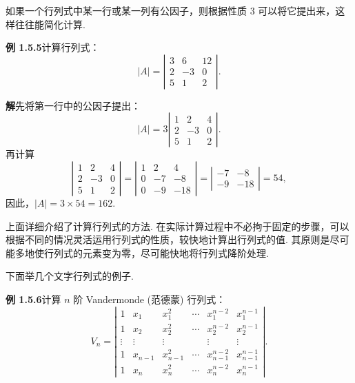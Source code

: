 \documentclass[UTF8,12pt,a4paper,fontset=fandol]{ctexart}
\begin{document}
如果一个行列式中某一行或某一列有公因子，则根据性质 3 可以将它提出来，这样往往能简化计算.

\noindent\textbf{例 1.5.5}\quad 计算行列式：
\[
|A|=\left|\begin{array}{rrr}
3 & 6 & 12\\
2 & -3 & 0\\
5 & 1 & 2
\end{array}\right|.
\]

\noindent\textbf{解}\quad 先将第一行中的公因子提出：
\[
|A|=3
\left|\begin{array}{rrr}
1 & 2 & 4\\
2 & -3 & 0\\
5 & 1 & 2
\end{array}\right|.
\]
再计算
\[
\left|\begin{array}{rrr}
1 & 2 & 4\\
2 & -3 & 0\\
5 & 1 & 2
\end{array}\right|
=
\left|\begin{array}{rrr}
1 & 2 & 4\\
0 & -7 & -8\\
0 & -9 & -18
\end{array}\right|
=
\left|\begin{array}{rr}
-7 & -8\\
-9 & -18
\end{array}\right|=54,
\]
因此，$|A|=3\times 54=162$.

上面详细介绍了计算行列式的方法. 在实际计算过程中不必拘于固定的步骤，可以根据不同的情况灵活运用行列式的性质，较快地计算出行列式的值. 其原则是尽可能多地使行列式的元素变为零，尽可能快地将行列式降阶处理.

下面举几个文字行列式的例子.

\noindent\textbf{例 1.5.6}\quad 计算 $n$ 阶 Vandermonde (范德蒙) 行列式：
\[
V_n=
\left|\begin{array}{cccccc}
1 & x_1 & x_1^2 & \cdots & x_1^{n-2} & x_1^{n-1}\\
1 & x_2 & x_2^2 & \cdots & x_2^{n-2} & x_2^{n-1}\\
\vdots & \vdots & \vdots & & \vdots & \vdots\\
1 & x_{n-1} & x_{n-1}^2 & \cdots & x_{n-1}^{n-2} & x_{n-1}^{n-1}\\
1 & x_n & x_n^2 & \cdots & x_n^{n-2} & x_n^{n-1}
\end{array}\right|.
\]
\end{document}
